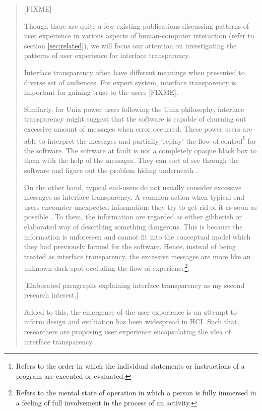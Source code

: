 \documentclass[a4paper,titlepage]{article}
\begin{document}
\begin{quote}
[FIXME]

Though there are quite a few existing publications discussing patterns
of user experience in various aspects of human-computer interaction
(refer to section \ref{sec:related}), we will focus our attention on
investigating the patterns of user experience for interface
transparency.

Interface transparency often have different meanings when presented to
diverse set of audiences. For expert system, interface transparency is
important for gaining trust to the users [FIXME].

Similarly, for Unix power users following the Unix philosophy,
interface transparency might suggest that the software is capable of
churning out excessive amount of messages when error occurred. These
power users are able to interpret the messages and partially `replay'
the flow of control\footnote{Refers to the order in which the
  individual statements or instructions of a program are executed or
  evaluated.}  for the software. The software at fault is not a
completely opaque black box to them with the help of the
messages. They can sort of see through the software and figure out the
problem hiding underneath \citep{unix:raymond}.

On the other hand, typical end-users do not usually consider excessive
messages as interface transparency. A common action when typical
end-users encounter unexpected information: they try to get rid of it
as soon as possible \citep{oldnew:chen}. To them, the information are
regarded as either gibberish or elaborated way of describing something
dangerous. This is because the information is unforeseen and cannot
fit into the conceptual model which they had previously formed for the
software. Hence, instead of being treated as interface transparency,
the excessive messages are more like an unknown dark spot occluding
the flow of experience\footnote{Refers to the mental state of
  operation in which a person is fully immersed in a feeling of full
  involvement in the process of an activity.}.


[Elaborated paragraphs explaining interface transparency as my second
  research interest.]

Added to this, the emergence of the user experience is an attempt to
inform design and evaluation has been widespread in HCI. Such that,
researchers are proposing user experience encapsulating the idea of
interface transparency.


\end{quote}
\end{document}
